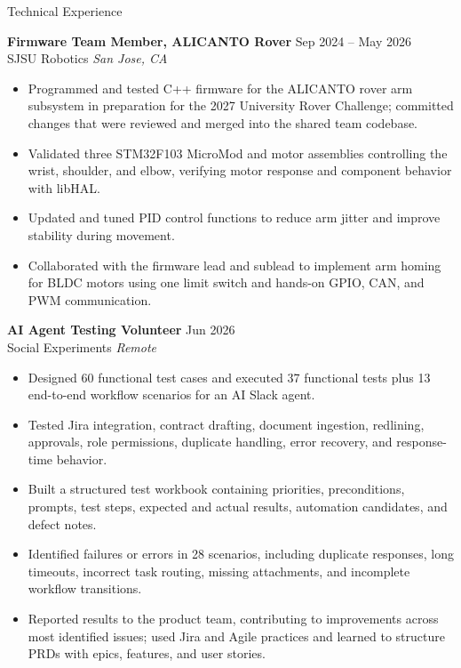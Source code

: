 \documentclass{resume}
\begin{document}
\begin{rSection}{Technical Experience}

\textbf{Firmware Team Member, ALICANTO Rover} \hfill Sep 2024 -- May 2026\\
SJSU Robotics \hfill \textit{San Jose, CA}
\begin{itemize}
    \itemsep -3pt {}
    \item Programmed and tested C++ firmware for the ALICANTO rover arm subsystem in preparation for the 2027 University Rover Challenge; committed changes that were reviewed and merged into the shared team codebase.
    \item Validated three STM32F103 MicroMod and motor assemblies controlling the wrist, shoulder, and elbow, verifying motor response and component behavior with libHAL.
    \item Updated and tuned PID control functions to reduce arm jitter and improve stability during movement.
    \item Collaborated with the firmware lead and sublead to implement arm homing for BLDC motors using one limit switch and hands-on GPIO, CAN, and PWM communication.
\end{itemize}

\textbf{AI Agent Testing Volunteer} \hfill Jun 2026\\
Social Experiments \hfill \textit{Remote}
\begin{itemize}
    \itemsep -3pt {}
    \item Designed 60 functional test cases and executed 37 functional tests plus 13 end-to-end workflow scenarios for an AI Slack agent.
    \item Tested Jira integration, contract drafting, document ingestion, redlining, approvals, role permissions, duplicate handling, error recovery, and response-time behavior.
    \item Built a structured test workbook containing priorities, preconditions, prompts, test steps, expected and actual results, automation candidates, and defect notes.
    \item Identified failures or errors in 28 scenarios, including duplicate responses, long timeouts, incorrect task routing, missing attachments, and incomplete workflow transitions.
    \item Reported results to the product team, contributing to improvements across most identified issues; used Jira and Agile practices and learned to structure PRDs with epics, features, and user stories.
\end{itemize}

\end{rSection}
\end{document}

